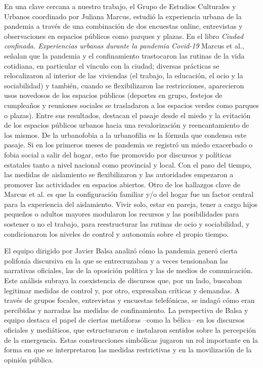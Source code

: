 \begin{refsection}
En una clave cercana a nuestro trabajo, el Grupo de Estudios Culturales y Urbanos coordinado por Juliana Marcus, estudió la experiencia urbana de la pandemia a través de una combinación de dos encuestas online, entrevistas y observaciones en espacios públicos como parques y plazas. En el libro \emph{Ciudad confinada. Experiencias urbanas durante la pandemia Covid-19} \protect\parencite*{4183-MARCUS2023} Marcus et al., señalan que la pandemia y el confinamiento trastocaron las rutinas de la vida cotidiana, en particular el vínculo con la ciudad; diversas prácticas se relocalizaron al interior de las viviendas (el trabajo, la educación, el ocio y la sociabilidad) y también, cuando se flexibilizaron las restricciones, aparecieron usos novedosos de los espacios públicos (deportes en grupo, festejos de cumpleaños y reuniones sociales se trasladaron a los espacios verdes como parques o plazas). Entre sus resultados, destacan el pasaje desde el miedo y la evitación de los espacios públicos urbanos hacia una revalorización y reencantamiento de los mismos. De la urbanofobia a la urbanofilia es la fórmula que condensa este pasaje. Si en los primeros meses de pandemia se registró un miedo exacerbado o fobia social a salir del hogar, esto fue promovido por discursos y políticas estatales tanto a nivel nacional como provincial y local. Con el paso del tiempo, las medidas de aislamiento se flexibilizaron y las autoridades empezaron a promover las actividades en espacios abiertos. Otro de los hallazgos clave de Marcus et al. es que la configuración familiar y/o del hogar fue un factor central para la experiencia del aislamiento. Vivir solo, estar en pareja, tener a cargo hijos pequeños o adultos mayores modularon los recursos y las posibilidades para sostener o no el trabajo, para reestructurar las rutinas de ocio y sociabilidad, y condicionaron los niveles de control y autonomía sobre el propio tiempo.

El equipo dirigido por Javier Balsa analizó cómo la pandemia generó cierta polifonía discursiva en la que se entrecruzaban y a veces tensionaban las narrativas oficiales, las de la oposición política y las de medios de comunicación. Este análisis subraya la coexistencia de discursos que, por un lado, buscaban legitimar medidas de control y, por otro, expresaban críticas y demandas. A través de grupos focales, entrevistas y encuestas telefónicas, se indagó cómo eran percibidas y narradas las medidas de confinamiento. La perspectiva de Balsa y equipo \protect\parencite*{4177-BALSA2023} destaca el papel de ciertas metáforas –como la bélica– en los discursos oficiales y mediáticos, que estructuraron e instalaron sentidos sobre la percepción de la emergencia. Estas construcciones simbólicas jugaron un rol importante en la forma en que se interpretaron las medidas restrictivas y en la movilización de la opinión pública.


\end{refsection}
